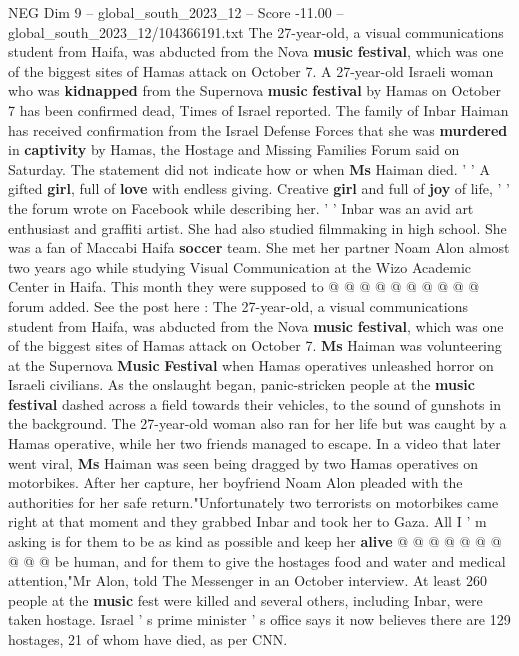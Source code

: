 \begin{textsample}{NEG Dim 9 – global\_south\_2023\_12 – Score -11.00 – global\_south\_2023\_12/104366191.txt}  \label{ex:f9_neg_301}
The 27-year-old, a visual communications student from Haifa, was abducted from the Nova \textbf{music} \textbf{festival}, which was one of the biggest sites of Hamas attack on October 7.
A 27-year-old Israeli woman who was \textbf{kidnapped} from the Supernova \textbf{music} \textbf{festival} by Hamas on October 7 has been confirmed dead, Times of Israel reported.
The family of Inbar Haiman has received confirmation from the Israel Defense Forces that she was \textbf{murdered} in \textbf{captivity} by Hamas, the Hostage and Missing Families Forum said on Saturday.
The statement did not indicate how or when \textbf{Ms} Haiman died. ' ' A gifted \textbf{girl}, full of \textbf{love} with endless giving.
Creative \textbf{girl} and full of \textbf{joy} of life, ' ' the forum wrote on Facebook while describing her. ' ' Inbar was an avid art enthusiast and graffiti artist.
She had also studied filmmaking in high school.
She was a fan of Maccabi Haifa \textbf{soccer} team.
She met her partner Noam Alon almost two years ago while studying Visual Communication at the Wizo Academic Center in Haifa.
This month they were supposed to @ @ @ @ @ @ @ @ @ @ forum added.
See the post here : The 27-year-old, a visual communications student from Haifa, was abducted from the Nova \textbf{music} \textbf{festival}, which was one of the biggest sites of Hamas attack on October 7. \textbf{Ms} Haiman was volunteering at the Supernova \textbf{Music} \textbf{Festival} when Hamas operatives unleashed horror on Israeli civilians.
As the onslaught began, panic-stricken people at the \textbf{music} \textbf{festival} dashed across a field towards their vehicles, to the sound of gunshots in the background.
The 27-year-old woman also ran for her life but was caught by a Hamas operative, while her two friends managed to escape.
In a video that later went viral, \textbf{Ms} Haiman was seen being dragged by two Hamas operatives on motorbikes.
After her capture, her boyfriend Noam Alon pleaded with the authorities for her safe return."Unfortunately two terrorists on motorbikes came right at that moment and they grabbed Inbar and took her to Gaza.
All I ' m asking is for them to be as kind as possible and keep her \textbf{alive} @ @ @ @ @ @ @ @ @ @ be human, and for them to give the hostages food and water and medical attention,"Mr Alon, told The Messenger in an October interview.
At least 260 people at the \textbf{music} fest were killed and several others, including Inbar, were taken hostage.
Israel ' s prime minister ' s office says it now believes there are 129 hostages, 21 of whom have died, as per CNN.

\end{textsample}
